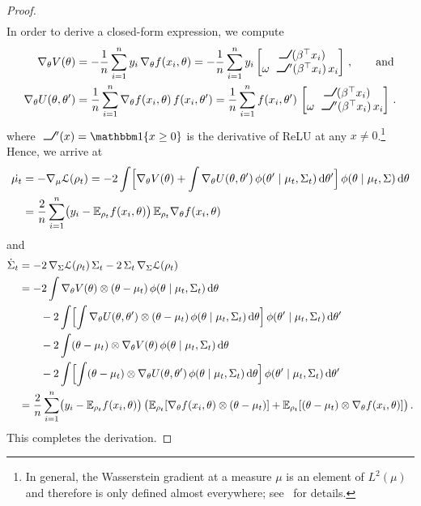 \documentclass{custom}
\begin{document}
\begin{proof}
\begin{align*}
\end{align*}
In order to derive a closed-form expression, we compute
\begin{align}
\nabla_{\theta}V(\theta)
& =-\frac{1}{n}\sum_{i=1}^{n}y_{i}\,\nabla_{\theta}f(x_{i},\theta)=-\frac{1}{n}\sum_{i=1}^{n}y_{i}\begin{bmatrix}
\ReLU(\beta^\top x_{i})\\
\omega\ReLU'(\beta^\top x_{i})\,x_{i}
\end{bmatrix}\,,\qquad\text{and}\label{eq:gradV}\\
\nabla_{\theta}U(\theta,\theta') & =\frac{1}{n}\sum_{i=1}^{n}\nabla_{\theta}f(x_{i},\theta)\,f(x_{i},\theta')=\frac{1}{n}\sum_{i=1}^{n}f(x_{i},\theta')\,\begin{bmatrix}
\ReLU(\beta^\top x_{i})\\
\omega\ReLU'(\beta^\top x_{i})\,x_{i}\label{eq:gradU}
\end{bmatrix}\,.
\end{align}
where $\ReLU'(x)=\ind\{x\geq 0\}$ is the derivative of ReLU at any $x\neq 0$.\footnote{In general, the Wasserstein gradient at a measure $\mu$ is an element of $L^2(\mu)$ and therefore is only defined almost everywhere; see~\citet[Chapter 8]{AGS} for details.}
Hence, we arrive at
\begin{align*}
\dot{\mu_{t}} & =-\nabla_{\mu}\EuScript{L}(\rho_{t})
=-2\int\Bigl[\nabla_{\theta}V(\theta)+\int\nabla_{\theta}U(\theta,\theta')\,\phi(\theta' \mid \mu_{t},\Sigma_{t})\,\mathrm{d}\theta'\Bigr]\,\phi(\theta \mid \mu_{t},\Sigma)\,\mathrm{d}\theta\\
 & =\frac{2}{n}\sum_{i=1}^{n} \bigl(y_{i}-\mathbb{E}_{\rho_{t}}f(x_{i},\theta)\bigr)\,\mathbb{E}_{\rho_{t}}\nabla_{\theta}f(x_{i},\theta)
\end{align*}
and
\begin{align*}
\dot{\Sigma}_{t} & =-2\,\nabla_{\Sigma}\EuScript{L}(\rho_{t})\,\Sigma_{t}-2\,\Sigma_{t}\,\nabla_{\Sigma}\EuScript{L}(\rho_{t})\\
 & =-2\int\nabla_{\theta}V(\theta)\otimes(\theta-\mu_{t})\,\phi(\theta\mid \mu_{t},\Sigma_{t})\,\mathrm{d}\theta \\
 &\qquad{} -2\int \Bigl[\int\nabla_{\theta}U(\theta,\theta')\otimes(\theta-\mu_{t})\,\phi(\theta\mid \mu_{t},\Sigma_{t})\,\mathrm{d}\theta\Bigr]\,\phi(\theta' \mid \mu_{t},\Sigma_{t})\,\mathrm{d}\theta'\\
 & \qquad{} -2\int(\theta-\mu_{t})\otimes\nabla_{\theta}V(\theta)\,\phi(\theta\mid \mu_{t},\Sigma_{t})\,\mathrm{d}\theta\\
 &\qquad{} -2\int\Bigl[\int(\theta-\mu_{t})\otimes\nabla_{\theta}U(\theta,\theta')\,\phi(\theta\mid \mu_{t},\Sigma_{t})\,\mathrm{d}\theta\Bigr]\,\phi(\theta' \mid \mu_{t},\Sigma_{t})\,\mathrm{d}\theta'\\
 & =\frac{2}{n}\sum_{i=1}^{n}\bigl(y_{i}-\mathbb{E}_{\rho_{t}} f(x_{i},\theta)\bigr)\,\bigl(\mathbb{E}_{\rho_{t}}[\nabla_{\theta}f(x_{i},\theta)\otimes(\theta-\mu_{t})]+\mathbb{E}_{\rho_{t}}[(\theta-\mu_t)\otimes\nabla_{\theta}f(x_{i},\theta)]\bigr)\,.
\end{align*}
This completes the derivation.
\end{proof}
\end{document}
